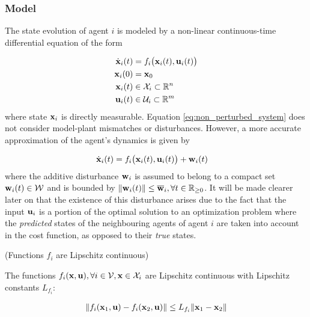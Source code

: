 \subsubsection{Model}

The state evolution of agent $i$ is modeled by a non-linear continuous-time
differential equation of the form

\begin{align}
  \dot{\bm{\mathbf{x}}}_i(t) &= f_i \big(\bm{\mathbf{x}}_i (t), \bm{\mathbf{u}}_i (t)\big) \label{eq:non_perturbed_system}\\
  \bm{\mathbf{x}}_i(0) &= \bm{\mathbf{x}}_0 \\
  \bm{\mathbf{x}}_i (t) &\in \mathcal{X}_i \subset \mathbb{R}^n \\
  \bm{\mathbf{u}}_i (t) &\in \mathcal{U}_i \subset \mathbb{R}^m
\end{align}
where state $\bm{\mathbf{x}}_i$ is directly measurable. Equation
\ref{eq:non_perturbed_system} does not consider model-plant mismatches or
disturbances. However, a more accurate approximation of the agent's dynamics
is given by

\begin{align}
  \dot{\bm{\mathbf{x}}}_i(t) &= f_i \big(\bm{\mathbf{x}}_i (t), \bm{\mathbf{u}}_i (t) \big) + \bm{\mathbf{w}}_i (t) \label{eq:perturbed_system}
\end{align}
where the additive disturbance $\bm{\mathbf{w}}_i$ is assumed
to belong to a compact set $\bm{\mathbf{w}}_i(t) \in \mathcal{W}$ and is bounded by
$\|\bm{\mathbf{w}}_i(t)\| \leq \overline{\bm{\mathbf{w}}}_i,\forall t \in \mathbb{R}_{\geq 0}$.
It will be made clearer later on that the existence of this disturbance arises
due to the fact that the input $\bm{\mathbf{u}}_i$ is a portion of the optimal solution
to an optimization problem where the \textit{predicted} states of the
neighbouring agents of agent $i$ are taken into account in the cost function,
as opposed to their \textit{true} states.

\begin{gg_box}
\begin{assumption} (Functions $f_i$ are Lipschitz continuous)

  The functions $f_i(\bm{\mathbf{x}}, \bm{\mathbf{u}}), \forall i \in \mathcal{V}, \bm{\mathbf{x}} \in \mathcal{X}_i$
  are Lipschitz continuous with Lipschitz constants $L_{f_i}$:

  \begin{align}
    \| f_i(\bm{\mathbf{x}}_1, \bm{\mathbf{u}}) - f_i(\bm{\mathbf{x}}_2, \bm{\mathbf{u}})\| \leq L_{f_i} \|\bm{\mathbf{x}}_1 - \bm{\mathbf{x}}_2 \|
  \end{align}

  \label{ass:f_i_Lipschitz}
\end{assumption}
\end{gg_box}



